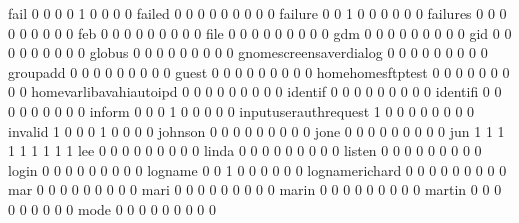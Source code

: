 \documentclass[compress,8pt]{beamer}
\begin{document}
\begin{frame}
\begin{Schunk}
  fail                                       0   0   0   0   1   0   0   0   0
  failed                                     0   0   0   0   0   0   0   0   0
  failure                                    0   0   1   0   0   0   0   0   0
  failures                                   0   0   0   0   0   0   0   0   0
  feb                                        0   0   0   0   0   0   0   0   0
  file                                       0   0   0   0   0   0   0   0   0
  gdm                                        0   0   0   0   0   0   0   0   0
  gid                                        0   0   0   0   0   0   0   0   0
  globus                                     0   0   0   0   0   0   0   0   0
  gnomescreensaverdialog                     0   0   0   0   0   0   0   0   0
  groupadd                                   0   0   0   0   0   0   0   0   0
  guest                                      0   0   0   0   0   0   0   0   0
  homehomesftptest                           0   0   0   0   0   0   0   0   0
  homevarlibavahiautoipd                     0   0   0   0   0   0   0   0   0
  identif                                    0   0   0   0   0   0   0   0   0
  identifi                                   0   0   0   0   0   0   0   0   0
  inform                                     0   0   0   1   0   0   0   0   0
  inputuserauthrequest                       1   0   0   0   0   0   0   0   0
  invalid                                    1   0   0   0   1   0   0   0   0
  johnson                                    0   0   0   0   0   0   0   0   0
  jone                                       0   0   0   0   0   0   0   0   0
  jun                                        1   1   1   1   1   1   1   1   1
  lee                                        0   0   0   0   0   0   0   0   0
  linda                                      0   0   0   0   0   0   0   0   0
  listen                                     0   0   0   0   0   0   0   0   0
  login                                      0   0   0   0   0   0   0   0   0
  logname                                    0   0   1   0   0   0   0   0   0
  lognamerichard                             0   0   0   0   0   0   0   0   0
  mar                                        0   0   0   0   0   0   0   0   0
  mari                                       0   0   0   0   0   0   0   0   0
  marin                                      0   0   0   0   0   0   0   0   0
  martin                                     0   0   0   0   0   0   0   0   0
  mode                                       0   0   0   0   0   0   0   0   0

\end{Schunk}
\end{frame}
\end{document}
